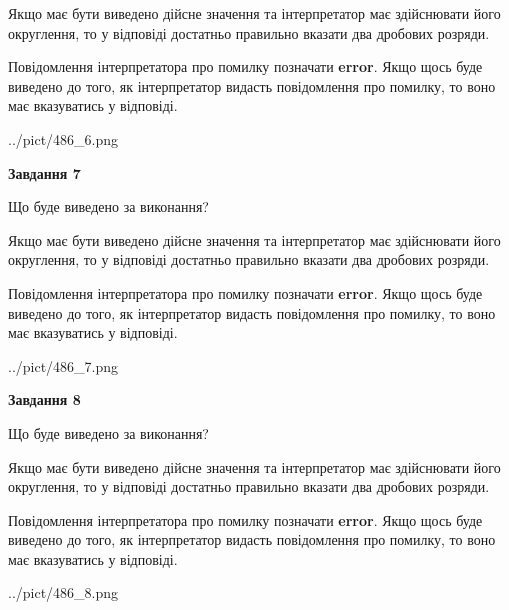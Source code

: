 \documentclass[12pt, ukrainian]{article}
\begin{document}
{\begin {Large}
Якщо має бути виведено дійсне значення та інтерпретатор має здійснювати його округлення, 
то у відповіді достатньо правильно вказати два дробових розряди.

Повідомлення інтерпретатора про помилку позначати \textbf{error}.
Якщо щось буде виведено до того, як інтерпретатор видасть повідомлення про помилку, 
то воно має вказуватись у відповіді. \par

\begin{center}
	{../pict/486_6.png}
\end{center}
\newpage

{\begin {center}\textbf{Завдання 7}\end {center}}\par
Що буде виведено за виконання? \par

Якщо має бути виведено дійсне значення та інтерпретатор має здійснювати його округлення, 
то у відповіді достатньо правильно вказати два дробових розряди.

Повідомлення інтерпретатора про помилку позначати \textbf{error}.
Якщо щось буде виведено до того, як інтерпретатор видасть повідомлення про помилку, 
то воно має вказуватись у відповіді. \par

\begin{center}
	{../pict/486_7.png}
\end{center}
\newpage

{\begin {center}\textbf{Завдання 8}\end {center}}\par
Що буде виведено за виконання? \par

Якщо має бути виведено дійсне значення та інтерпретатор має здійснювати його округлення, 
то у відповіді достатньо правильно вказати два дробових розряди.

Повідомлення інтерпретатора про помилку позначати \textbf{error}.
Якщо щось буде виведено до того, як інтерпретатор видасть повідомлення про помилку, 
то воно має вказуватись у відповіді. \par

\begin{center}
	{../pict/486_8.png}
\end{center}
\newpage


\end{Large}}
\end{document}
